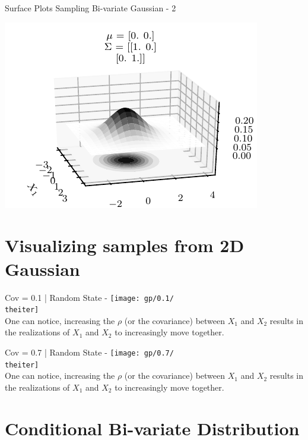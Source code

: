 \documentclass{beamer}
\begin{document}
\begin{frame}{Surface Plots Sampling Bi-variate Gaussian - 2}
	\begin{center}
		\includegraphics[height=\textheight -10pt ,keepaspectratio]{gp/2dgp3d2}
	\end{center}
\end{frame}

\section{Visualizing samples from 2D Gaussian}

%
{%
	\begin{frame}{Cov = 0.1 | Random State - \theiter}
		\texttt{[image: gp/0.1/\\theiter]}\\
		One can notice, increasing the $\rho$ (or the covariance) between $X_1$ and $X_2$ results in the realizations of $X_1$ and $X_2$ to increasingly move together.
	\end{frame}
}
%
{%
	\begin{frame}{Cov = 0.7 | Random State - \theiter}
		\texttt{[image: gp/0.7/\\theiter]}\\
		One can notice, increasing the $\rho$ (or the covariance) between $X_1$ and $X_2$ results in the realizations of $X_1$ and $X_2$ to increasingly move together.
	\end{frame}
}

\section{Conditional Bi-variate Distribution}
\end{document}

